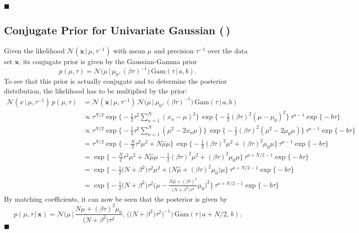 \documentclass[11pt, a4paper]{scrartcl}
\renewcommand{\vec}[1]{\bm{#1}}
\newcommand{\given}{\,\vert\,}
\newcommand{\biggiven}{\,\big\vert\,}
\newcommand{\Bigggiven}{\,\Bigg\vert\,}
\newcommand{\eot}{\hfill\(\blacksquare\)}
\newcommand{\diffstar}{\texorpdfstring{\raisebox{-1pt}{\resizebox{!}{8pt}{\(\star\)}}}{*}}
\newcommand{\twostar}  {(\diffstar\,\diffstar)}
\begin{document}
			\eot

		\subsection{Conjugate Prior for Univariate Gaussian  \twostar}

			Given the likelihood \( \mathcal{N}(\vec{x} \given \mu, \tau^{-1}) \) with mean \(\mu\) and precision \(\tau^{-1}\) over the data set \(\vec{x}\), its conjugate prior is given by the Gaussian-Gamma prior
			\begin{equation}
				p(\mu, \tau) = \mathcal{N}\big( \mu \biggiven \mu_0, (\beta \tau)^{-1} \big) \, \mathrm{Gam}(\tau \given a, b).
			\end{equation}
			To see that this prior is actually conjugate and to determine the posterior distribution, the likelihood has to be multiplied by the prior:
			\begin{align}
				\mathcal{N}(x \given \mu, \tau^{-1}) \, p(\mu, \tau)
					&= \mathcal{N}(\vec{x} \given \mu, \tau^{-1}) \, \mathcal{N}\big( \mu \biggiven \mu_0, (\beta \tau)^{-1} \big) \, \mathrm{Gam}(\tau \given a, b) \\
					&\propto \tau^{N/2} \exp\bigg\{\! -\frac{1}{2} \tau^2 \sum_{n = 1}^{N} (x_n - \mu)^2 \bigg\} \, \exp\bigg\{\! -\frac{1}{2} (\beta\tau)^2 (\mu - \mu_0)^2 \bigg\} \, \tau^{a - 1} \exp\big\{\! -\!b\tau \big\} \\
					&\propto \tau^{N/2} \exp\bigg\{\! -\frac{1}{2} \tau^2 \sum_{n = 1}^{N} (\mu^2 - 2 x_n \mu) \bigg\} \, \exp\bigg\{\! -\frac{1}{2} (\beta\tau)^2 (\mu^2 - 2 \mu_0 \mu) \bigg\} \, \tau^{a - 1} \exp\big\{\! -\!b\tau \big\} \\
					&= \tau^{N/2} \exp\bigg\{\! -\frac{N}{2} \tau^2 \mu^2 + N \hat{\mu} \mu \bigg\} \, \exp\bigg\{\! -\frac{1}{2} (\beta\tau)^2 \mu^2 + (\beta\tau)^2 \mu_0 \mu \bigg\} \, \tau^{a - 1} \exp\big\{\! -\!b\tau \big\} \\
					&= \exp\bigg\{\! -\frac{N}{2} \tau^2 \mu^2 + N \hat{\mu} \mu - \frac{1}{2} (\beta\tau)^2 \mu^2 + (\beta\tau)^2 \mu_0 \mu \bigg\} \, \tau^{a + N/2 - 1} \exp\big\{\! -\!b\tau \big\} \\
					&= \exp\bigg\{\! -\frac{1}{2} \big( N + \beta^2 \big) \tau^2 \mu^2 + \big( N \hat{\mu} + (\beta\tau)^2 \mu_0 \big) \mu \bigg\} \, \tau^{a + N/2 - 1} \exp\big\{\! -\!b\tau \big\} \\
					&= \exp\Bigg\{\! -\frac{1}{2} \big( N + \beta^2 \big) \tau^2 \bigg(\! \mu - \frac{N \hat{\mu} + (\beta\tau)^2}{\big( N + \beta^2 \big) \tau^2} \mu_0 \!\bigg)^2 \Bigg\} \, \tau^{a + N/2 - 1} \exp\big\{\! -\!b\tau \big\}
			\end{align}
			By matching coefficients, it can now be seen that the posterior is given by
			\begin{equation}
				p(\mu, \tau \given \vec{x}) = \mathcal{N}\Bigg(\! \mu \Bigggiven \frac{N \hat{\mu} + (\beta\tau)^2 \mu_0}{\big( N + \beta^2 \big) \tau^2},\, \big( \big(N + \beta^2\big) \tau^2 \big)^{-1} \Bigg) \, \mathrm{Gam}(\tau \given a + N/2,\, b).
			\end{equation}
			\eot
\end{document}
